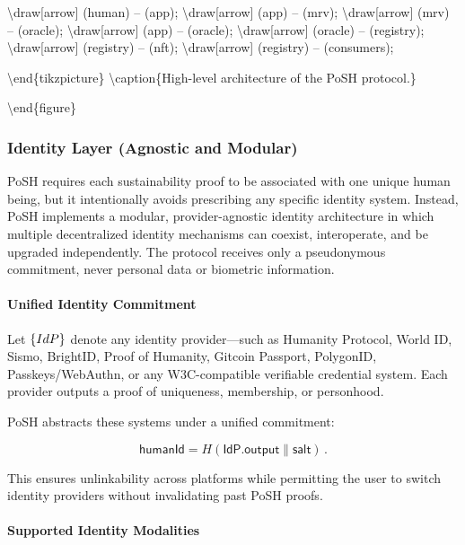 \documentclass{article}
\begin{document}
{\textbackslash}draw[arrow] (human) -- (app);
{\textbackslash}draw[arrow] (app) -- (mrv);
{\textbackslash}draw[arrow] (mrv) -- (oracle);
{\textbackslash}draw[arrow] (app) -- (oracle);
{\textbackslash}draw[arrow] (oracle) -- (registry);
{\textbackslash}draw[arrow] (registry) -- (nft);
{\textbackslash}draw[arrow] (registry) -- (consumers);

{\textbackslash}end\{tikzpicture\}
{\textbackslash}caption\{High-level architecture of the PoSH protocol.\}

{\textbackslash}end\{figure\}

\subsubsection{Identity Layer (Agnostic and Modular)}

PoSH requires each sustainability proof to be associated with one unique human
being, but it intentionally avoids prescribing any specific identity system.
Instead, PoSH implements a modular, provider-agnostic identity architecture in
which multiple decentralized identity mechanisms can coexist, interoperate, and
be upgraded independently. The protocol receives only a pseudonymous commitment,
never personal data or biometric information.

\paragraph{Unified Identity Commitment}

Let $\textsf\{IdP\}$ denote any identity provider---such as Humanity Protocol,
World ID, Sismo, BrightID, Proof of Humanity, Gitcoin Passport, PolygonID,
Passkeys/WebAuthn, or any W3C-compatible verifiable credential system. Each
provider outputs a proof of uniqueness, membership, or personhood.

PoSH abstracts these systems under a unified commitment:

\begin{equation}
\mathsf{humanId} = H(\textsf{IdP.output} \parallel \textsf{salt}) \, .
\end{equation}

This ensures unlinkability across platforms while permitting the user to switch
identity providers without invalidating past PoSH proofs.

\paragraph{Supported Identity Modalities}
\end{document}

